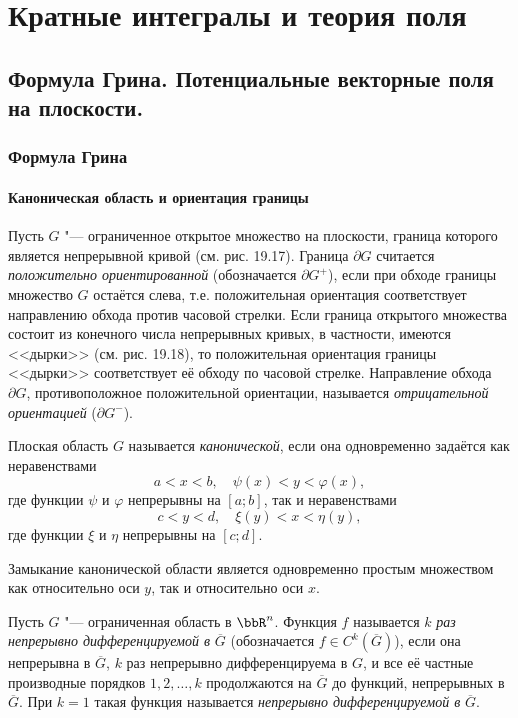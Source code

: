 \part{Кратные интегралы и теория поля}

\chapter{Формула Грина. Потенциальные векторные поля на плоскости.}
\section{Формула Грина} 

\subsection{Каноническая область и ориентация границы}

\begin{defn}
Пусть $G$ "--- ограниченное открытое множество на плоскости, граница которого является непрерывной кривой (см. рис. 19.17). Граница $\partial G$ считается \textit{положительно ориентированной} (обозначается $\partial G^+$), если при обходе границы множество $G$ остаётся слева, т.е. положительная ориентация соответствует направлению обхода против часовой стрелки. Если граница открытого множества состоит из конечного числа непрерывных кривых, в частности, имеются <<дырки>> (см. рис. 19.18), то положительная ориентация границы <<дырки>> соответствует её обходу по часовой стрелке. Направление обхода $\partial G$, противоположное положительной ориентации, называется \textit{отрицательной ориентацией} ($\partial G^-$).
\end{defn}

\begin{defn}
Плоская область $G$ называется \textit{канонической}, если она одновременно задаётся как неравенствами
$$
a < x < b, \quad \psi(x) < y < \varphi(x),
$$
где функции $\psi$ и $\varphi$ непрерывны на $[a;b]$, так и неравенствами
$$
c < y < d, \quad \xi(y) < x < \eta(y),
$$
где функции $\xi$ и $\eta$ непрерывны на $[c;d]$.

Замыкание канонической области является одновременно простым множеством как относительно оси $y$, так и относительно оси $x$.
\end{defn}

\begin{defn}
Пусть $G$ "--- ограниченная область в $\bbR^n$. Функция $f$ называется $k$ \textit{раз непрерывно дифференцируемой в} $\overline{G}$ (обозначается $f \in C^k(\overline{G})$), если она непрерывна в $\overline{G}$, $k$ раз непрерывно дифференцируема в $G$, и все её частные производные порядков $1, 2, \ldots, k$ продолжаются на $\overline{G}$ до функций, непрерывных в $\overline{G}$. При $k = 1$ такая функция называется \textit{непрерывно дифференцируемой в} $\overline{G}$.
\end{defn}


